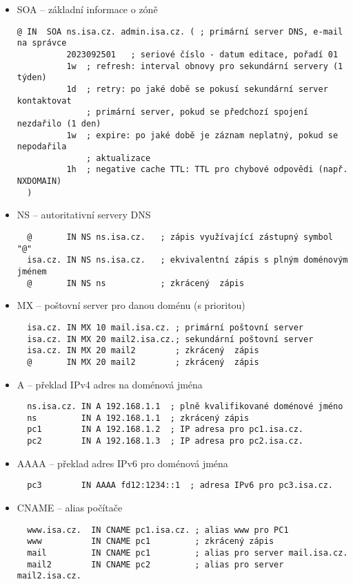 \begin{itemize}
  \item SOA -- základní informace o zóně
\begin{verbatim}
@ IN  SOA ns.isa.cz. admin.isa.cz. ( ; primární server DNS, e-mail na správce
          2023092501   ; seriové číslo - datum editace, pořadí 01
          1w  ; refresh: interval obnovy pro sekundární servery (1 týden)
          1d  ; retry: po jaké době se pokusí sekundární server kontaktovat
              ; primární server, pokud se předchozí spojení nezdařilo (1 den)
          1w  ; expire: po jaké době je záznam neplatný, pokud se nepodařila
              ; aktualizace
          1h  ; negative cache TTL: TTL pro chybové odpovědi (např. NXDOMAIN)
  )
\end{verbatim}
  \clearpage
  \item NS -- autoritativní servery DNS 
\begin{verbatim}
  @       IN NS ns.isa.cz.   ; zápis využívající zástupný symbol "@"
  isa.cz. IN NS ns.isa.cz.   ; ekvivalentní zápis s plným doménovým jménem
  @       IN NS ns           ; zkrácený  zápis
\end{verbatim}        
  \item MX -- poštovní server pro danou doménu (s prioritou)
\begin{verbatim}
  isa.cz. IN MX 10 mail.isa.cz. ; primární poštovní server 
  isa.cz. IN MX 20 mail2.isa.cz.; sekundární poštovní server
  isa.cz. IN MX 20 mail2        ; zkrácený  zápis
  @       IN MX 20 mail2        ; zkrácený  zápis
\end{verbatim}        
  \item A -- překlad IPv4 adres na doménová jména
\begin{verbatim}
  ns.isa.cz. IN A 192.168.1.1  ; plně kvalifikované doménové jméno
  ns         IN A 192.168.1.1  ; zkrácený zápis
  pc1        IN A 192.168.1.2  ; IP adresa pro pc1.isa.cz.
  pc2        IN A 192.168.1.3  ; IP adresa pro pc2.isa.cz.
\end{verbatim}        
  \item AAAA -- překlad adres IPv6 pro doménová jména
\begin{verbatim}
  pc3        IN AAAA fd12:1234::1  ; adresa IPv6 pro pc3.isa.cz.
\end{verbatim}        
  \item CNAME -- alias počítače
\begin{verbatim}
  www.isa.cz.  IN CNAME pc1.isa.cz. ; alias www pro PC1
  www          IN CNAME pc1         ; zkrácený zápis
  mail         IN CNAME pc1         ; alias pro server mail.isa.cz.
  mail2        IN CNAME pc2         ; alias pro server mail2.isa.cz.   
\end{verbatim}        
\end{itemize}

